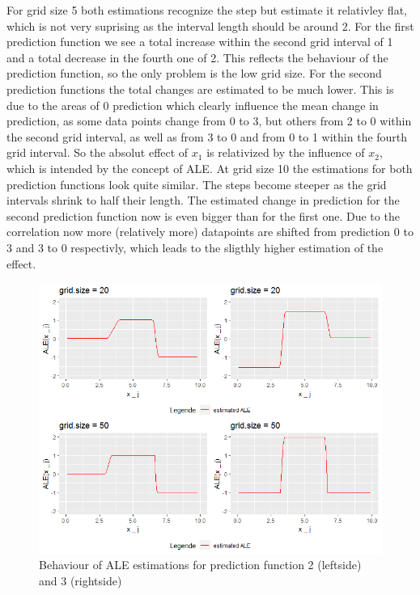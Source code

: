 \documentclass[
]{krantz}
\begin{document}
For grid size 5 both estimations recognize the step but estimate it relativley flat, which is not very suprising as the interval length should be around 2. For the first prediction function we see a total increase within the second grid interval of 1 and a total decrease in the fourth one of 2. This reflects the behaviour of the prediction function, so the only problem is the low grid size. For the second prediction functions the total changes are estimated to be much lower. This is due to the areas of 0 prediction which clearly influence the mean change in prediction, as some data points change from 0 to 3, but others from 2 to 0 within the second grid interval, as well as from 3 to 0 and from 0 to 1 within the fourth grid interval. So the absolut effect of \(x_1\) is relativized by the influence of \(x_2\), which is intended by the concept of ALE.
At grid size 10 the estimations for both prediction functions look quite similar. The steps become steeper as the grid intervals shrink to half their length. The estimated change in prediction for the second prediction function now is even bigger than for the first one. Due to the correlation now more (relatively more) datapoints are shifted from prediction 0 to 3 and 3 to 0 respectivly, which leads to the sligthly higher estimation of the effect.

\begin{figure}
\includegraphics[width=1\linewidth]{images/ALE_2_pwc_example5_gs20_50_} \caption{Behaviour of ALE estimations for prediction function 2 (leftside) and 3 (rightside)}\label{fig:pwcexample5gs2050}
\end{figure}
\end{document}
